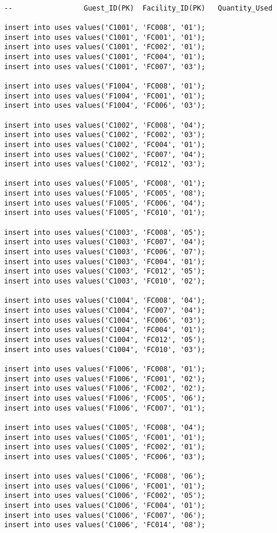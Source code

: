 \documentclass[a4,12pt]{report}
\begin{document}
\begin{lstlisting}

--                 Guest_ID(PK)  Facility_ID(PK)   Quantity_Used  

insert into uses values('C1001', 'FC008', '01');
insert into uses values('C1001', 'FC001', '01');
insert into uses values('C1001', 'FC002', '01');
insert into uses values('C1001', 'FC004', '01');
insert into uses values('C1001', 'FC007', '03');

insert into uses values('F1004', 'FC008', '01');
insert into uses values('F1004', 'FC001', '01');
insert into uses values('F1004', 'FC006', '03');

insert into uses values('C1002', 'FC008', '04');
insert into uses values('C1002', 'FC002', '03');
insert into uses values('C1002', 'FC004', '01');
insert into uses values('C1002', 'FC007', '04');
insert into uses values('C1002', 'FC012', '03');

insert into uses values('F1005', 'FC008', '01');
insert into uses values('F1005', 'FC005', '08');
insert into uses values('F1005', 'FC006', '04');
insert into uses values('F1005', 'FC010', '01');

insert into uses values('C1003', 'FC008', '05');
insert into uses values('C1003', 'FC007', '04');
insert into uses values('C1003', 'FC006', '07');
insert into uses values('C1003', 'FC004', '01');
insert into uses values('C1003', 'FC012', '05');
insert into uses values('C1003', 'FC010', '02');

insert into uses values('C1004', 'FC008', '04');
insert into uses values('C1004', 'FC007', '04');
insert into uses values('C1004', 'FC006', '03');
insert into uses values('C1004', 'FC004', '01');
insert into uses values('C1004', 'FC012', '05');
insert into uses values('C1004', 'FC010', '03');

insert into uses values('F1006', 'FC008', '01');
insert into uses values('F1006', 'FC001', '02');
insert into uses values('F1006', 'FC002', '02');
insert into uses values('F1006', 'FC005', '06');
insert into uses values('F1006', 'FC007', '01');

insert into uses values('C1005', 'FC008', '04');
insert into uses values('C1005', 'FC001', '01');
insert into uses values('C1005', 'FC002', '01');
insert into uses values('C1005', 'FC006', '03');

insert into uses values('C1006', 'FC008', '06');
insert into uses values('C1006', 'FC001', '01');
insert into uses values('C1006', 'FC002', '05');
insert into uses values('C1006', 'FC004', '01');
insert into uses values('C1006', 'FC007', '06');
insert into uses values('C1006', 'FC014', '08');


\end{lstlisting}
\end{document}
